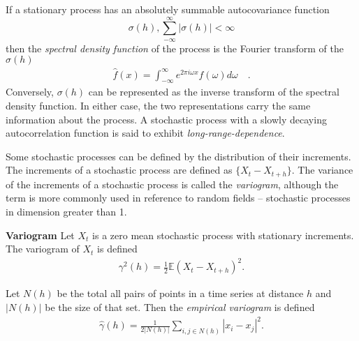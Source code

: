   If a stationary process has an absolutely summable 
  autocovariance function
  \[
  \sigma(h), \sum_{-\infty}^{\infty}|\sigma(h)| < \infty
  \] then the
   \textit{spectral density function} of the process 
   is the Fourier transform of the $\sigma(h)$
   \begin{align}
      \hat f(x) =  \int_{-\infty}^{\infty} e^{2 \pi i \omega x} f(\omega)d \omega \hspace{1em}.
    \end{align}
  Conversely, $\sigma(h)$ can be represented as
   the inverse transform of 
  the spectral density function. In either case, the two 
  representations carry the same information about the process.
A stochastic process with a slowly decaying autocorrelation function
is said to exhibit \textit{long-range-dependence}. 

Some stochastic processes can be defined by the distribution 
of their increments. The increments of a stochastic process are defined as $\{ X_t - X_{t+h} \}$. The variance of the increments
of a stochastic process is called the \textit{variogram}, 
although the term is more commonly used in reference to 
random fields -- stochastic processes in dimension greater than 1. 
\begin{defn}{\textbf{Variogram} }\label{def:variogram}
Let $X_t$ is a zero mean stochastic process with 
stationary increments. The variogram of $X_t$ 
is  defined
\begin{align*}
  \gamma^2(h) = \frac{1}{2}\mathbb{E}\left(X_t - X_{t + h} \right)^2.
\end{align*}
\end{defn}
Let $N(h)$ be the total all pairs of points in 
a time series at distance
$h$ and $|N(h)|$ be the size of that set. Then the \textit{empirical variogram} is defined 
\begin{align*}
  \hat \gamma(h) =  \frac{1}{2|N(h)|}  \sum_{i,j\in N(h)} |x_i - x_j|^2.
\end{align*}
   
